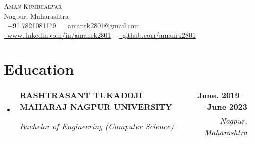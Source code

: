 \documentclass[letterpaper,11pt]{article}
\makeatletter
\newcommand{\resumeSubheading}[4]{
  \vspace{-2pt}\item
    \begin{tabular*}{1.0\textwidth}[t]{l@{\extracolsep{\fill}}r}
      \textbf{#1} & \textbf{\small #2} \\
      \textit{\small#3} & \textit{\small #4} \\
    \end{tabular*}\vspace{-7pt}
}
\newcommand{\resumeSubHeadingListStart}{\begin{itemize}[leftmargin=0.0in, label={}]}
\newcommand{\resumeSubHeadingListEnd}{\end{itemize}}
\makeatother
\begin{document}

\begin{center}
    {\Huge \scshape Aman Kumbhalwar} \\ \vspace{1pt}
    Nagpur, Maharashtra \\ \vspace{1pt}
    \small \raisebox{-0.1\height}\faPhone\ +91 7821081179 ~ \href{mailto:amanrk2801@gmail.com}{\raisebox{-0.2\height}\faEnvelope\  \underline{amanrk2801@gmail.com}} ~ 
    \href{https://linkedin.com/in//}{\raisebox{-0.2\height}\faLinkedin\ \underline{www.linkedin.com/in/amanrk2801}}  ~
    \href{https://github.com/}{\raisebox{-0.2\height}\faGithub\ \underline{github.com/amanrk2801}}
    \vspace{-8pt}
\end{center}


\section{Education}
  \resumeSubHeadingListStart
    \resumeSubheading
      {RASHTRASANT TUKADOJI MAHARAJ NAGPUR UNIVERSITY}{June. 2019 -- June 2023}
      {Bachelor of Engineering (Computer Science)}{Nagpur, Maharashtra}
  \resumeSubHeadingListEnd

\end{document}
